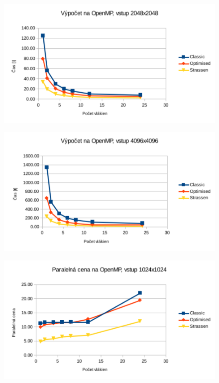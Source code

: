 \documentclass[slovak]{article}
\begin{document}
\begin{figure}\centering
	\includegraphics[scale=1]{./images/2048_rychlost.pdf}
	\label{gr:graf2}
\end{figure}  

\begin{figure}\centering
	\includegraphics[scale=1]{./images/4096_rychlost.pdf}
	\label{gr:graf3}
\end{figure}  

\begin{figure}\centering
	\includegraphics[scale=1]{./images/1024_cena.pdf}
	\label{gr:graf4}
\end{figure}  
\end{document}
